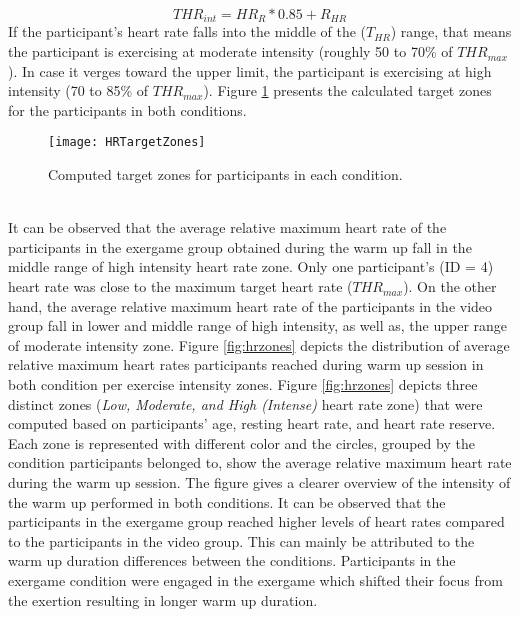\begin{equation}
THR_{int} =  HR_{R}*0.85 + R_{HR} 
\end{equation} If the participant's heart rate falls into the middle of the (\begin{math} T_{HR}\end{math}) range, that means the participant is exercising at moderate intensity (roughly 50 to 70\% of \begin{math} THR_{max}\end{math}). In case it verges toward the upper limit, the participant is exercising at high intensity (70 to 85\% of \begin{math} THR_{max}\end{math}). Figure \ref{fig:hrZones} presents the calculated target zones for the participants in both conditions.
\begin{figure}[h]
    \centering
    \texttt{[image: HRTargetZones]}
    \caption{Computed target zones for participants in each condition.}
    \label{fig:hrZones}
\end{figure}\\
It can be observed that the average relative maximum heart rate of the participants in the exergame group obtained during the warm up fall in the middle range of high intensity heart rate zone. Only one participant's (ID = 4) heart rate was close to the maximum target heart rate (\begin{math} THR_{max}\end{math}). On the other hand, the average relative maximum heart rate of the participants in the video group fall in lower and middle range of high intensity, as well as, the upper range of moderate intensity zone. Figure \ref{fig:hrzones} depicts the distribution of average relative maximum heart rates participants reached during warm up session in both condition per exercise intensity zones. Figure \ref{fig:hrzones} depicts three distinct zones (\textit{Low, Moderate, and High (Intense)} heart rate zone) that were computed based on participants' age, resting heart rate, and heart rate reserve. Each zone is represented with different color and the circles, grouped by the condition participants belonged to, show the average relative maximum heart rate during the warm up session. The figure gives a clearer overview of the intensity of the warm up performed in both conditions. It can be observed that the participants in the exergame group reached higher levels of heart rates compared to the participants in the video group. This can mainly be attributed to the warm up duration differences between the conditions. Participants in the exergame condition were engaged in the exergame which shifted their focus from the exertion resulting in longer warm up duration.
